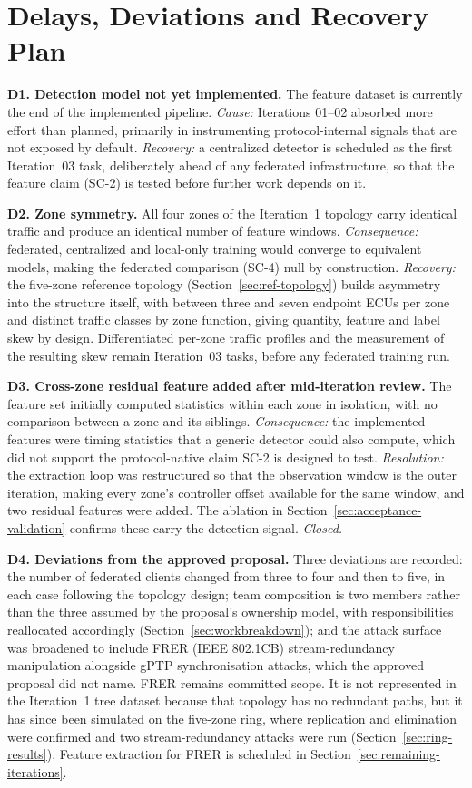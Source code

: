 \section{Delays, Deviations and Recovery Plan}
\label{sec:delays}

\textbf{D1. Detection model not yet implemented.} The feature dataset is currently the
end of the implemented pipeline. \emph{Cause:} Iterations 01--02 absorbed more effort
than planned, primarily in instrumenting protocol-internal signals that are not
exposed by default. \emph{Recovery:} a centralized detector is scheduled as the first
Iteration~03 task, deliberately ahead of any federated infrastructure, so that the
feature claim (SC-2) is tested before further work depends on it.

\textbf{D2. Zone symmetry.} All four zones of the Iteration~1 topology carry identical
traffic and produce an identical number of feature windows. \emph{Consequence:}
federated, centralized and local-only training would converge to equivalent models,
making the federated comparison (SC-4) null by construction. \emph{Recovery:} the
five-zone reference topology (Section~\ref{sec:ref-topology}) builds asymmetry into the structure itself,
with between three and seven endpoint ECUs per zone and distinct traffic classes by
zone function, giving quantity, feature and label skew by design. Differentiated
per-zone traffic profiles and the measurement of the resulting skew remain Iteration~03
tasks, before any federated training run.

\textbf{D3. Cross-zone residual feature added after mid-iteration review.} The
feature set initially computed statistics within each zone in isolation, with no
comparison between a zone and its siblings. \emph{Consequence:} the implemented
features were timing statistics that a generic detector could also compute, which did
not support the protocol-native claim SC-2 is designed to test. \emph{Resolution:} the
extraction loop was restructured so that the observation window is the outer iteration,
making every zone's controller offset available for the same window, and two residual
features were added. The ablation in Section~\ref{sec:acceptance-validation} confirms these carry the detection
signal. \emph{Closed.}

\textbf{D4. Deviations from the approved proposal.} Three deviations are recorded:
the number of federated clients changed from three to four and then to five, in each
case following the topology
design; team composition is two members rather than the three assumed by the
proposal's ownership model, with responsibilities reallocated accordingly
(Section~\ref{sec:workbreakdown}); and the attack surface was broadened to include FRER (IEEE 802.1CB)
stream-redundancy manipulation alongside gPTP synchronisation attacks, which the
approved proposal did not name. FRER remains committed scope. It is not represented in the Iteration~1 tree
dataset because that topology has no redundant paths, but it has since been simulated on
the five-zone ring, where replication and elimination were confirmed and two
stream-redundancy attacks were run (Section~\ref{sec:ring-results}). Feature extraction
for FRER is scheduled in Section~\ref{sec:remaining-iterations}.

